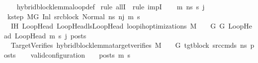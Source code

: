 \begin{isabellebody}
%
\isadelimproof
\ \ %
\endisadelimproof
%
\isatagproof
{}\isamarkupfalse%
\ hybrid{\isacharunderscore}{\kern0pt}block{\isacharunderscore}{\kern0pt}lemma{\isacharunderscore}{\kern0pt}loop{\isacharunderscore}{\kern0pt}def\isanewline
{}\isamarkupfalse%
\ {\isacharparenleft}{\kern0pt}rule\ allI\ {\isacharbar}{\kern0pt}\ rule\ impI{\isacharparenright}{\kern0pt}{\isacharplus}{\kern0pt}\isanewline
\ \ \isamarkupfalse%
\ m{\isacharprime}{\kern0pt}\ ns\ s{\isacharprime}{\kern0pt}\ j\isanewline
\isanewline
\ \ \isamarkupfalse%
\ k{\isacharunderscore}{\kern0pt}step{\isacharcolon}{\kern0pt}\ {\isachardoublequoteopen}M{\isacharcomma}{\kern0pt}{\isasymLambda}{\isacharcomma}{\kern0pt}{\isasymGamma}{\isacharcomma}{\kern0pt}{\isasymOmega}{\isacharcomma}{\kern0pt}G\ {\isasymturnstile}{\isacharparenleft}{\kern0pt}Inl\ src{\isacharunderscore}{\kern0pt}block{\isacharcomma}{\kern0pt}\ Normal\ ns{\isacharparenright}{\kern0pt}\ {\isacharminus}{\kern0pt}n{\isasymrightarrow}{\isacharcircum}{\kern0pt}j\ {\isacharparenleft}{\kern0pt}m{\isacharprime}{\kern0pt}{\isacharcomma}{\kern0pt}\ s{\isacharprime}{\kern0pt}{\isacharparenright}{\kern0pt}{\isachardoublequoteclose}\ \isanewline
\ \ IH{\isacharcolon}{\kern0pt}\ {\isachardoublequoteopen}{\isasymforall}{\isacharparenleft}{\kern0pt}LoopHead{\isacharcomma}{\kern0pt}\ LoopHead{\isacharprime}{\kern0pt}{\isacharparenright}{\kern0pt}{\isasymin}lsLoopHead{\isachardot}{\kern0pt}\ loop{\isacharunderscore}{\kern0pt}ih{\isacharunderscore}{\kern0pt}optimizations\ M\ {\isasymLambda}\ {\isasymGamma}\ {\isasymOmega}\ G\ G{\isacharprime}{\kern0pt}\ LoopHead\ LoopHead{\isacharprime}{\kern0pt}\ m{\isacharprime}{\kern0pt}\ s{\isacharprime}{\kern0pt}\ j\ posts{\isachardoublequoteclose}\ \isanewline
\ \ TargetVerifies{\isacharcolon}{\kern0pt}\ {\isachardoublequoteopen}hybrid{\isacharunderscore}{\kern0pt}block{\isacharunderscore}{\kern0pt}lemma{\isacharunderscore}{\kern0pt}target{\isacharunderscore}{\kern0pt}verifies\ M\ {\isasymLambda}\ {\isasymGamma}\ {\isasymOmega}\ G{\isacharprime}{\kern0pt}\ tgt{\isacharunderscore}{\kern0pt}block\ src{\isacharunderscore}{\kern0pt}cmds\ ns\ posts{\isachardoublequoteclose}\isanewline
\isanewline
\ \ \isamarkupfalse%
\ {\isachardoublequoteopen}valid{\isacharunderscore}{\kern0pt}configuration\ {\isasymLambda}\ {\isasymGamma}\ {\isasymOmega}\ posts\ m{\isacharprime}{\kern0pt}\ s{\isacharprime}{\kern0pt}{\isachardoublequoteclose}\isanewline
\ \ \isamarkupfalse%

\end{isabellebody}
